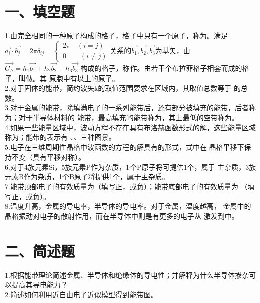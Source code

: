 \documentclass[UTF8]{ctexart}
\begin{document}
\section*{一、填空题}
1.由完全相同的一种原子构成的格子，格子中只有一个原子，称为\underline{\makebox[7em]{}}。满足$\vec{a_i}\cdot\vec{b_j}
=2\pi\delta_{ij}=\begin{cases}
    2\pi\quad(i=j)\\
    0\quad\quad(i\neq j)
\end{cases}$关系的$\vec{b_1},\vec{b_2},\vec{b_3}$为基矢，由$\vec{G_h}=h_1\vec{b_1}+h_2\vec{b_2}+h_3\vec{b_3}$
构成的格子，称作\underline{\makebox[4em]{}}。由若干个布拉菲格子相套而成的格子，叫做\underline{\makebox[6em]{}}。其
原胞中有\underline{\makebox[3em]{}}以上的原子。\\
2.对于固体的能带，简约波矢k的取值范围要求在\underline{\makebox[9em]{}}区域内，其取值总数等于\underline{\makebox[3em]{}}
的总数。\\
3.对于金属的能带，除填满电子的一系列能带后，还有部分被填充的能带，后者称为\underline{\makebox[3em]{}}；对于半导体材料的
能带，最高填充的能带称为\underline{\makebox[3em]{}}，其上最低的空带称为\underline{\makebox[3em]{}}。\\
4.如果一些能量区域中，波动方程不存在具有布洛赫函数形式的解，这些能量区域称为\underline{\makebox[3em]{}}；能带的表示有
\underline{\makebox[12em]{}}、\underline{\makebox[12em]{}}、\underline{\makebox[12em]{}}三种图景。\\
5.电子在三维周期性晶格中波函数的方程的解具有\underline{\makebox[15em]{}}的形式，式中\underline{\makebox[4em]{}}在
晶格平移下保持不变（具有平移对称）。\\
6.对于4族元素Si，5族元素P作为杂质，1个P原子将可提供1个\underline{\makebox[3em]{}}，属于\underline{\makebox[2em]{}}
主杂质，3族元素B作为杂质，1个B原子将提供1个\underline{\makebox[3em]{}}，属于\underline{\makebox[2em]{}}主杂质。\\
7.能带顶部电子的有效质量为\underline{\makebox[2em]{}}（填写正，或负）；能带底部电子的有效质量为\underline{\makebox[2em]{}}
（填写正，或负）。\\
8.温度升高，金属的导电率\underline{\makebox[3em]{}}，半导体的导电率\underline{\makebox[3em]{}}。对于金属，温度越高，
金属中的晶格振动对电子的散射作用\underline{\makebox[3em]{}}，而在半导体中则是有更多的电子从\underline{\makebox[3em]{}}
激发到\underline{\makebox[3em]{}}中。\\
\section*{二、简述题}
1.根据能带理论简述金属、半导体和绝缘体的导电性；并解释为什么半导体掺杂可以提高其导电能力？\\
2.简述如何利用近自由电子近似模型得到能带图。\\
\end{document}
